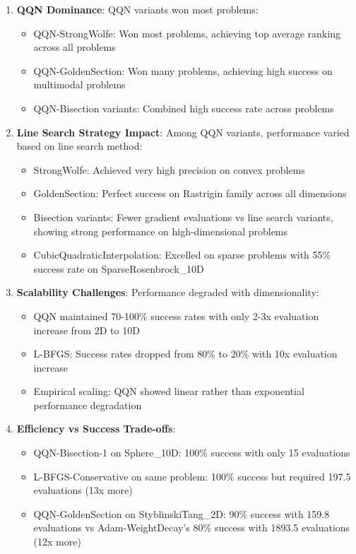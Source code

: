\begin{enumerate}
\def\labelenumi{\arabic{enumi}.}
\tightlist
\item
  \textbf{QQN Dominance}: QQN variants won most problems:

  \begin{itemize}
  \tightlist
  \item
    QQN-StrongWolfe: Won most problems, achieving top average ranking across all problems
  \item
    QQN-GoldenSection: Won many problems, achieving high success on multimodal problems
  \item
    QQN-Bisection variants: Combined high success rate across problems
  \end{itemize}
\item
  \textbf{Line Search Strategy Impact}: Among QQN variants, performance varied based on line search method:

  \begin{itemize}
  \tightlist
  \item
    StrongWolfe: Achieved very high precision on convex problems
  \item
    GoldenSection: Perfect success on Rastrigin family across all dimensions
  \item
    Bisection variants: Fewer gradient evaluations vs line search variants, showing strong performance on high-dimensional problems
  \item
    CubicQuadraticInterpolation: Excelled on sparse problems with 55\% success rate on SparseRosenbrock\_10D
  \end{itemize}
\item
  \textbf{Scalability Challenges}: Performance degraded with dimensionality:

  \begin{itemize}
  \tightlist
  \item
    QQN maintained 70-100\% success rates with only 2-3x evaluation increase from 2D to 10D
  \item
    L-BFGS: Success rates dropped from 80\% to 20\% with 10x evaluation increase
  \item
    Empirical scaling: QQN showed linear rather than exponential performance degradation
  \end{itemize}
\item
  \textbf{Efficiency vs Success Trade-offs}:

  \begin{itemize}
  \tightlist
  \item
    QQN-Bisection-1 on Sphere\_10D: 100\% success with only 15 evaluations
  \item
    L-BFGS-Conservative on same problem: 100\% success but required 197.5 evaluations (13x more)
  \item
    QQN-GoldenSection on StyblinskiTang\_2D: 90\% success with 159.8 evaluations vs Adam-WeightDecay's 80\% success with 1893.5 evaluations (12x more)
  \end{itemize}
\end{enumerate}

